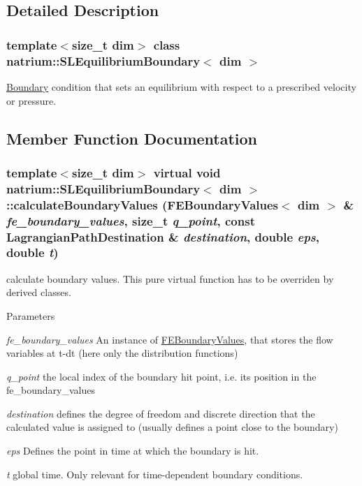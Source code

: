 \subsection{Detailed Description}
\subsubsection*{template$<$size\_\-t dim$>$ class natrium::SLEquilibriumBoundary$<$ dim $>$}

\hyperlink{classnatrium_1_1Boundary}{Boundary} condition that sets an equilibrium with respect to a prescribed velocity or pressure. 

\subsection{Member Function Documentation}
\hypertarget{classnatrium_1_1SLEquilibriumBoundary_a25ba9ab8c3263043b158e913d130bd2d}{
\subsubsection[{calculateBoundaryValues}]{\setlength{\rightskip}{0pt plus 5cm}template$<$size\_\-t dim$>$ virtual void {\bf natrium::SLEquilibriumBoundary}$<$ dim $>$::calculateBoundaryValues ({\bf FEBoundaryValues}$<$ dim $>$ \& {\em fe\_\-boundary\_\-values}, \/  size\_\-t {\em q\_\-point}, \/  const {\bf LagrangianPathDestination} \& {\em destination}, \/  double {\em eps}, \/  double {\em t})}}
\label{classnatrium_1_1SLEquilibriumBoundary_a25ba9ab8c3263043b158e913d130bd2d}


calculate boundary values. This pure virtual function has to be overriden by derived classes. 
\begin{DoxyParams}{Parameters}
\item[{\em fe\_\-boundary\_\-values}]An instance of \hyperlink{classnatrium_1_1FEBoundaryValues}{FEBoundaryValues}, that stores the flow variables at t-\/dt (here only the distribution functions) \item[{\em q\_\-point}]the local index of the boundary hit point, i.e. its position in the fe\_\-boundary\_\-values \item[{\em destination}]defines the degree of freedom and discrete direction that the calculated value is assigned to (usually defines a point close to the boundary) \item[{\em eps}]Defines the point in time at which the boundary is hit. \item[{\em t}]global time. Only relevant for time-\/dependent boundary conditions. \end{DoxyParams}


